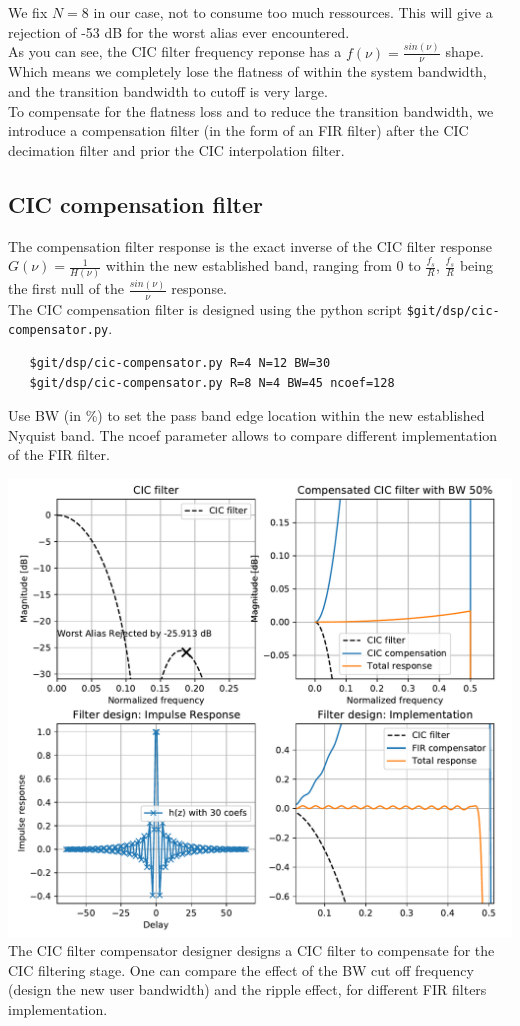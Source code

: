 \documentclass{article}
\begin{document}
We fix $N=8$ in our case, not to consume too much ressources.
This will give a rejection of
-53 dB for the worst alias ever encountered. \\

As you can see, the CIC filter frequency reponse has a
$f(\nu) = \frac{sin(\nu)}{\nu}$ shape.
Which means we completely lose the flatness of within
the system bandwidth, and the transition bandwidth to cutoff
is very large. \\

To compensate for the flatness loss and to reduce
the transition bandwidth, 
we introduce a compensation filter (in the form of an FIR
filter) after the CIC decimation filter
and prior the CIC interpolation filter.

\subsection{CIC compensation filter}

The compensation filter response is the exact inverse
of the CIC filter response $G(\nu) = \frac{1}{H(\nu)}$ 
within the new established band, ranging
from 0 to $\frac{f_s}{R}$,
$\frac{f_s}{R}$ being the first null of the $\frac{sin(\nu)}{\nu}$ response. \\

The CIC compensation filter is designed
using the python script {\tt \$git/dsp/cic-compensator.py}. 

\begin{verbatim}
   $git/dsp/cic-compensator.py R=4 N=12 BW=30
   $git/dsp/cic-compensator.py R=8 N=4 BW=45 ncoef=128
\end{verbatim}

Use BW (in \%) to set the pass band edge
location within the new established Nyquist band.
The ncoef parameter allows to compare different
implementation of the FIR filter.

\begin{center}
	\includegraphics[width=0.75\linewidth]{fir-des-2.pdf} \\
	The CIC filter compensator designer designs a CIC
	filter to compensate for the CIC filtering stage.
	One can compare the effect of the BW cut off frequency
	(design the new user bandwidth) and the ripple effect,
	for different FIR filters implementation.
\end{center}
\end{document}

